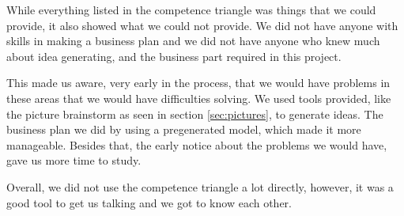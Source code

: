 While everything listed in the competence triangle was things that we could provide, it also showed what we could not provide.
We did not have anyone with skills in making a business plan and we did not have anyone who knew much about idea generating, and the business part required in this project.

This made us aware, very early in the process, that we would have problems in these areas that we would have difficulties solving. We used tools provided, like the picture brainstorm as seen in section \ref{sec:pictures}, to generate ideas. The business plan we did by using a pregenerated model, which made it more manageable. Besides that, the early notice about the problems we would have, gave us more time to study. 

Overall, we did not use the competence triangle a lot directly, however, it was a good tool to get us talking and we got to know each other. 
